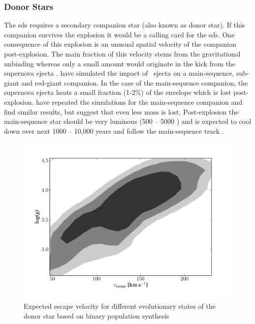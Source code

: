 \subsubsection{Donor Stars}

The \gls{sds} requires a secondary companion star (also known as donor star). If this companion survives the explosion it would be a calling card for the \gls{sds}. One consequence of this explosion is an unusual spatial velocity of the companion post-explosion. The main fraction of this velocity stems from the gravitational unbinding whereas only a small amount would originate in the kick from the supernova ejecta \citep[see Figure \ref{fig:han2008_vrad};][]{2001ApJ...550L..53C,2008ApJ...677L.109H}. \citet{2000ApJS..128..615M} have simulated the impact of \snia\ ejecta on a main-sequence, sub-giant and red-giant companion. In the case of the main-sequence companion, the supernova ejecta heats a small fraction (1-2\%) of the envelope which is lost post-explosion. \citet{2008A&A...489..943P} have repeated the simulations for the main-sequence companion and find similar results, but suggest that even less mass is lost. Post-explosion the main-sequence star should be very luminous (500 -- 5000 \lsun) and is expected to cool down over next 1000 -- 10,000 years and follow the main-sequence track  \citep{2000ApJS..128..615M}. 

\begin{figure}[tb] %
   \centering
   \includegraphics[width=\textwidth, trim=0 0 2cm 0, clip]{chapter_intro/plots/theo_vrad.pdf} 
   \caption[Expected escape velocities for donor stars]{Expected escape velocity for different evolutionary states of the donor star based on binary population synthesis \citep[][data kindly provided by Z. Han]{2008ApJ...677L.109H} }
   \label{fig:han2008_vrad}
\end{figure}

